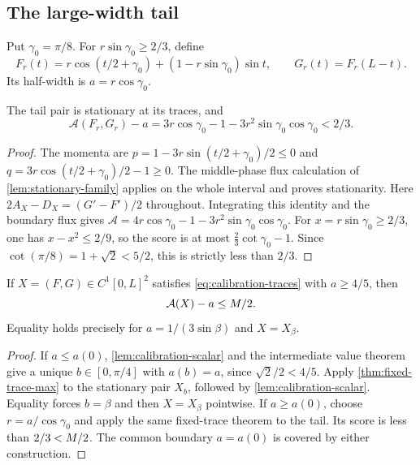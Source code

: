 \subsection{The large-width tail}

Put $\gamma_0=\pi/8$. For $r\sin\gamma_0\ge2/3$, define
\[
 F_r(t)=r\cos(t/2+\gamma_0)+(1-r\sin\gamma_0)\sin t,
 \qquad G_r(t)=F_r(L-t).
\]
Its half-width is $a=r\cos\gamma_0$.

\begin{lemma}\label{lem:calibration-tail}
The tail pair is stationary at its traces, and
\[
 \mathcal A(F_r,G_r)-a
       =3r\cos\gamma_0-1-3r^2\sin\gamma_0\cos\gamma_0<2/3.
\]
\end{lemma}
\begin{proof}
The momenta are $p=1-3r\sin(t/2+\gamma_0)/2\le0$ and
$q=3r\cos(t/2+\gamma_0)/2-1\ge0$. The middle-phase flux
calculation of \cref{lem:stationary-family} applies on the whole
interval and proves stationarity.
Here $2A_X-D_X=(G'-F')/2$ throughout. Integrating this identity
and the boundary flux gives
$\mathcal A=4r\cos\gamma_0-1-3r^2\sin\gamma_0\cos\gamma_0$.
For $x=r\sin\gamma_0\ge2/3$, one has $x-x^2\le2/9$, so
the score is at most $\tfrac23\cot\gamma_0-1$.
Since $\cot(\pi/8)=1+\sqrt2<5/2$, this is strictly less than $2/3$.
\end{proof}

\begin{theorem}\label{thm:global-calibration}
If $X=(F,G)\in C^1[0,L]^2$ satisfies
\cref{eq:calibration-traces} with $a\ge4/5$, then
\begin{equation}\label{eq:global-calibration}
 \mathcal A(X)-a\le M/2.
\end{equation}
Equality holds precisely for $a=1/(3\sin\beta)$ and $X=X_\beta$.
\end{theorem}
\begin{proof}
If $a\le a(0)$, \cref{lem:calibration-scalar} and the intermediate
value theorem give a unique $b\in[0,\pi/4]$ with $a(b)=a$,
since $\sqrt2/2<4/5$. Apply \cref{thm:fixed-trace-max} to the
stationary pair $X_b$, followed by \cref{lem:calibration-scalar}.
Equality forces $b=\beta$ and then $X=X_\beta$ pointwise.
If $a\ge a(0)$, choose $r=a/\cos\gamma_0$ and apply the same
fixed-trace theorem to the tail. Its score is less than $2/3<M/2$.
The common boundary $a=a(0)$ is covered by either construction.
\end{proof}

